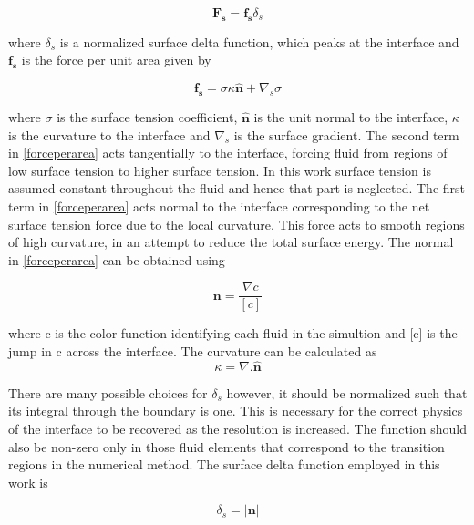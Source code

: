 \begin{equation}
 \mathbf{F_s} = \mathbf{f_s} \delta_s
\end{equation}

\noindent
where $\delta_s$ is a normalized surface delta function, which peaks at the interface and $\mathbf{f_s}$ is the force per unit area given by

\begin{equation}
 \mathbf{f_s} = \sigma \kappa \mathbf{\hat{n}} + \nabla_s \sigma
 \label{forceperarea}
\end{equation}

\noindent
where $\sigma$ is the surface tension coefficient, $\mathbf{\hat{n}}$ is the unit normal to the interface, $\kappa$ is the curvature to the interface and $\nabla_s$ is the surface gradient. The second term in \ref{forceperarea} acts tangentially to the interface, forcing fluid from regions of low surface tension to higher surface tension. In this work surface tension is assumed constant throughout the fluid and hence that part is neglected. The first term in \ref{forceperarea} acts normal to the interface corresponding to the net surface tension force due to the local curvature. This force acts to smooth regions of high curvature, in an attempt to reduce the total surface energy.
The normal in \ref{forceperarea} can be obtained using

\begin{equation}
 \mathbf{n} = \frac{\nabla c}{[c]}
\end{equation}

\noindent
where c is the color function identifying each fluid in the simultion and [c] is the jump in c across the interface. The curvature can be calculated as
\begin{equation}
 \kappa = \nabla . \mathbf{\hat{n}}
\end{equation}

\noindent
There are many possible choices for $\delta_s$ however, it should be normalized such that its integral through the boundary is one. This is necessary for the correct physics of the interface to be recovered as the resolution is increased. The function should also be non-zero only in those fluid elements that correspond to the transition regions in the numerical method. The surface delta function employed in this work is

\begin{equation}
 \delta_s = \left| \mathbf{n} \right |
\end{equation}


